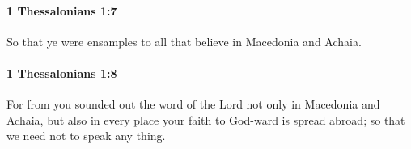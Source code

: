 		\paragraph{1 Thessalonians 1:7} %
			\label{1THESSALONIANS-1-7}

			So that ye were ensamples to all that believe in Macedonia and Achaia.

			\begin{framed}
			\scriptsize
				\begin{compactdesc}
					\item[SBLG] 
				\end{compactdesc}
			\end{framed}

		\paragraph{1 Thessalonians 1:8} %
			\label{1THESSALONIANS-1-8}

			For from you sounded out the word of the Lord not only in Macedonia and Achaia, but also in every place your faith to God-ward is spread abroad; so that we need not to speak any thing.

